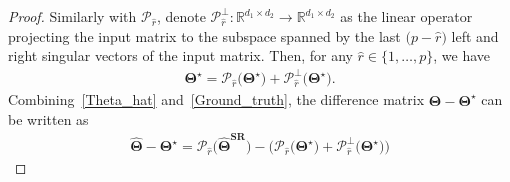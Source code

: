 \documentclass[12pt]{article}
\begin{document}
\begin{proof}
Similarly with $\mathcal{P}_{\widehat{r}}$, denote $\mathcal{P}_{\widehat{r}}^{\perp}:\mathbb{R}^{d_{1} \times d_{2}}\rightarrow{\mathbb{R}^{d_{1} \times d_{2}}}$ as the linear operator projecting the input matrix to the subspace spanned by the last $\big( p-\widehat{r} \big)$ left and right singular vectors of the input matrix.
Then, for any $\widehat{r}\in\{1,\dots,p\}$, we have 
\begin{align} \label{Ground_truth}
    \boldsymbol{\Theta^\star} = \mathcal{P}_{\widehat{r}}\big( \boldsymbol{\Theta^\star} \big)
    + \mathcal{P}^{\perp}_{\widehat{r}}\big( \boldsymbol{\Theta^\star} \big).
\end{align}
Combining~\eqref{Theta_hat} and~\eqref{Ground_truth}, the difference matrix $\widehat{\mathbf{\Theta}} - \boldsymbol{\Theta^\star}$
can be written as 
\begin{align}
    \widehat{\mathbf{\Theta}} - \boldsymbol{\Theta^\star} = 
    \mathcal{P}_{\widehat{r}}\big( \boldsymbol{\widehat{\Theta}^\text{SR}} \big) - \big( \mathcal{P}_{\widehat{r}}\big( \boldsymbol{\Theta^\star} \big) + \mathcal{P}^{\perp}_{\widehat{r}}\big( \boldsymbol{\Theta^\star} \big) \big)
\end{align}


\end{proof}
\end{document}
